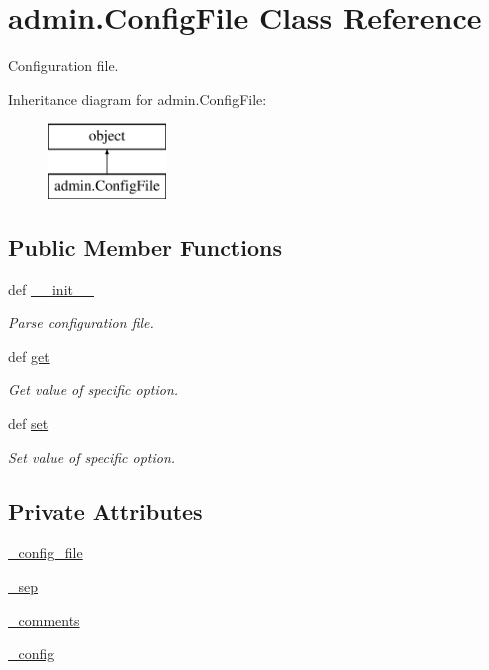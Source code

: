 \hypertarget{classadmin_1_1ConfigFile}{\section{admin.\-Config\-File Class Reference}
\label{classadmin_1_1ConfigFile}
}


Configuration file.  


Inheritance diagram for admin.\-Config\-File\-:\begin{figure}[H]
\begin{center}
\leavevmode
\includegraphics[height=2.000000cm]{d0/d8b/classadmin_1_1ConfigFile}
\end{center}
\end{figure}
\subsection*{Public Member Functions}
\begin{DoxyCompactItemize}
\item 
def \hyperlink{classadmin_1_1ConfigFile_a01f801b702c4cb7e322a8dee7943f5ff}{\-\_\-\-\_\-init\-\_\-\-\_\-}
\begin{DoxyCompactList}\small\item\em Parse configuration file. \end{DoxyCompactList}\item 
def \hyperlink{classadmin_1_1ConfigFile_a3a60d1611c929d782773d73d339454ab}{get}
\begin{DoxyCompactList}\small\item\em Get value of specific option. \end{DoxyCompactList}\item 
def \hyperlink{classadmin_1_1ConfigFile_a05413f3b3760fe95cf8038c400cb2b4f}{set}
\begin{DoxyCompactList}\small\item\em Set value of specific option. \end{DoxyCompactList}\end{DoxyCompactItemize}
\subsection*{Private Attributes}
\begin{DoxyCompactItemize}
\item 
\hyperlink{classadmin_1_1ConfigFile_ada03146a25635d360b9994efcd3eb6ce}{\-\_\-config\-\_\-file}
\item 
\hyperlink{classadmin_1_1ConfigFile_a3f7db562c59049e6a3b28b1fdfafa63e}{\-\_\-sep}
\item 
\hyperlink{classadmin_1_1ConfigFile_ac15829b16933412a7db88d3dacdcf345}{\-\_\-comments}
\item 
\hyperlink{classadmin_1_1ConfigFile_a5a5c415d13ee87e1a03c9f64231a4fc9}{\-\_\-config}
\end{DoxyCompactItemize}


